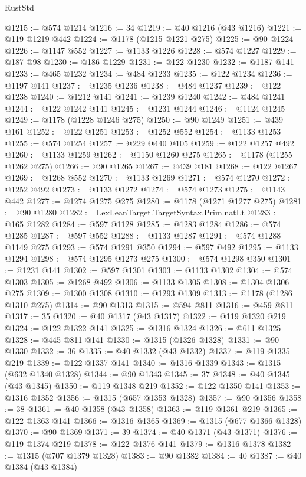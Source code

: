 \begin{lexlean}{RustStd}
\begin{coremodule}
{\begin{coremodule}
{{{{{{{{{{{{{{{{{{{{{{{{{{{{{{{{{{{{{{{{{{{{{{{@1215 := @574 @1214
@1216 := 34
@1219 := @40 @1216 (@43 @1216)
@1221 := @119 @1219 @442
@1224 := @1178 (@1215 @1221 @275)
@1225 := @90 @1224
@1226 := @1147 @552
@1227 := @1133 @1226
@1228 := @574 @1227
@1229 := @187 @98
@1230 := @186 @1229
@1231 := @122 @1230
@1232 := @1187 @141
@1233 := @465 @1232
@1234 := @484 @1233
@1235 := @122 @1234
@1236 := @1197 @141
@1237 := @1235 @1236
@1238 := @484 @1237
@1239 := @122 @1238
@1240 := @1212 @141
@1241 := @1239 @1240
@1242 := @484 @1241
@1244 := @122 @1242 @141
@1245 := @1231 @1244
@1246 := @1124 @1245
@1249 := @1178 (@1228 @1246 @275)
@1250 := @90 @1249
@1251 := @439 @161
@1252 := @122 @1251
@1253 := @1252 @552
@1254 := @1133 @1253
@1255 := @574 @1254
@1257 := @229 @440 @105
@1259 := @122 @1257 @492
@1260 := @1133 @1259
@1262 := @1150 @1260 @275
@1265 := @1178 (@1255 @1262 @275)
@1266 := @90 @1265
@1267 := @439 @181
@1268 := @122 @1267
@1269 := @1268 @552
@1270 := @1133 @1269
@1271 := @574 @1270
@1272 := @1252 @492
@1273 := @1133 @1272
@1274 := @574 @1273
@1275 := @1143 @442
@1277 := @1274 @1275 @275
@1280 := @1178 (@1271 @1277 @275)
@1281 := @90 @1280
@1282 := LexLeanTarget.TargetSyntax.Prim.natLt
@1283 := @165 @1282
@1284 := @597 @1128
@1285 := @1283 @1284
@1286 := @574 @1285
@1287 := @597 @552
@1288 := @1133 @1287
@1291 := @574 @1288 @1149 @275
@1293 := @574 @1291 @350
@1294 := @597 @492
@1295 := @1133 @1294
@1298 := @574 @1295 @1273 @275
@1300 := @574 @1298 @350
@1301 := @1231 @141
@1302 := @597 @1301
@1303 := @1133 @1302
@1304 := @574 @1303
@1305 := @1268 @492
@1306 := @1133 @1305
@1308 := @1304 @1306 @275
@1309 := @1300 @1308
@1310 := @1293 @1309
@1313 := @1178 (@1286 @1310 @275)
@1314 := @90 @1313
@1315 := @594 @811
@1316 := @459 @811
@1317 := 35
@1320 := @40 @1317 (@43 @1317)
@1322 := @119 @1320 @219
@1324 := @122 @1322 @141
@1325 := @1316 @1324
@1326 := @611 @1325
@1328 := @445 @811 @141
@1330 := @1315 (@1326 @1328)
@1331 := @90 @1330
@1332 := 36
@1335 := @40 @1332 (@43 @1332)
@1337 := @119 @1335 @219
@1339 := @122 @1337 @141
@1340 := @1316 @1339
@1343 := @1315 (@632 @1340 @1328)
@1344 := @90 @1343
@1345 := 37
@1348 := @40 @1345 (@43 @1345)
@1350 := @119 @1348 @219
@1352 := @122 @1350 @141
@1353 := @1316 @1352
@1356 := @1315 (@657 @1353 @1328)
@1357 := @90 @1356
@1358 := 38
@1361 := @40 @1358 (@43 @1358)
@1363 := @119 @1361 @219
@1365 := @122 @1363 @141
@1366 := @1316 @1365
@1369 := @1315 (@677 @1366 @1328)
@1370 := @90 @1369
@1371 := 39
@1374 := @40 @1371 (@43 @1371)
@1376 := @119 @1374 @219
@1378 := @122 @1376 @141
@1379 := @1316 @1378
@1382 := @1315 (@707 @1379 @1328)
@1383 := @90 @1382
@1384 := 40
@1387 := @40 @1384 (@43 @1384)
}}}}}}}}}}}}}}}}}}}}}}}}}}}}}}}}}}}}}}}}}}}}}}}
\end{coremodule}}
\end{coremodule}
\end{lexlean}
